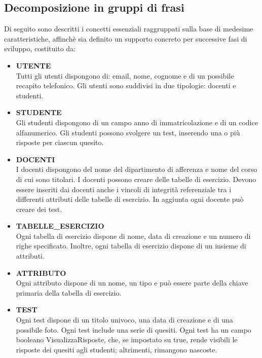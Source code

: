 \documentclass{article}
\begin{document}
\subsection{Decomposizione in gruppi di frasi}
\large
Di seguito sono descritti i concetti essenziali raggruppati sulla base di medesime caratteristiche, affinchè sia definito un supporto concreto per successive fasi di sviluppo, costituito da:
\begin{itemize}[label={-}]
    \itemsep1px
    \item \textbf{UTENTE} \vspace*{3px}\\ Tutti gli utenti dispongono di: email, nome, cognome e di un possibile recapito telefonico. Gli utenti sono suddivisi in due tipologie: docenti e studenti. 
    \item \textbf{STUDENTE} \vspace*{3px}\\ Gli studenti dispongono di un campo anno di immatricolazione e di un codice alfanumerico. Gli studenti possono svolgere un test, inserendo una o più risposte per ciascun quesito.
    \item \textbf{DOCENTI} \vspace*{3px}\\ I docenti dispongono del nome del dipartimento di afferenza e nome del corso di cui sono titolari. I docenti possono creare delle tabelle di esercizio. Devono essere inseriti dai docenti anche i vincoli di integrità referenziale tra i differenti attributi delle tabelle di esercizio. In aggiunta ogni docente può creare dei test.
    \item \textbf{TABELLE\_ESERCIZIO} \vspace*{3px}\\ Ogni tabella di esercizio dispone di nome, data di creazione e un numero di righe specificato. Inoltre, ogni tabella di esercizio dispone di un insieme di attributi.
    \item \textbf{ATTRIBUTO} \vspace*{3px}\\ Ogni attributo dispone di un nome, un tipo e può essere parte della chiave primaria della tabella di esercizio. 
    \item \textbf{TEST} \vspace*{3px}\\ Ogni test dispone di un titolo univoco, una data di creazione e di una possibile foto. Ogni test include una serie di quesiti. Ogni test ha un campo booleano VisualizzaRisposte, che, se impostato su true, rende visibili le risposte dei quesiti agli studenti; altrimenti, rimangono nascoste.

\end{itemize}
\end{document}
